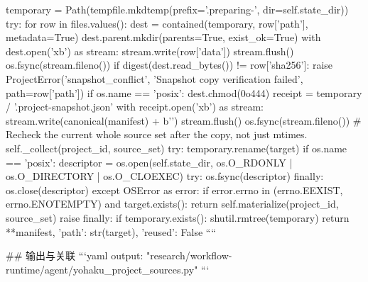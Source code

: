         temporary = Path(tempfile.mkdtemp(prefix='.preparing-', dir=self.state_dir))
        try:
            for row in files.values():
                dest = contained(temporary, row['path'], metadata=True)
                dest.parent.mkdir(parents=True, exist_ok=True)
                with dest.open('xb') as stream:
                    stream.write(row['data'])
                    stream.flush()
                    os.fsync(stream.fileno())
                if digest(dest.read_bytes()) != row['sha256']:
                    raise ProjectError('snapshot_conflict', 'Snapshot copy verification failed', path=row['path'])
                if os.name == 'posix':
                    dest.chmod(0o444)
            receipt = temporary / '.project-snapshot.json'
            with receipt.open('xb') as stream:
                stream.write(canonical(manifest) + b'\n')
                stream.flush()
                os.fsync(stream.fileno())
            # Recheck the current whole source set after the copy, not just mtimes.
            self._collect(project_id, source_set)
            try:
                temporary.rename(target)
                if os.name == 'posix':
                    descriptor = os.open(self.state_dir, os.O_RDONLY | os.O_DIRECTORY | os.O_CLOEXEC)
                    try:
                        os.fsync(descriptor)
                    finally:
                        os.close(descriptor)
            except OSError as error:
                if error.errno in (errno.EEXIST, errno.ENOTEMPTY) and target.exists():
                    return self.materialize(project_id, source_set)
                raise
        finally:
            if temporary.exists():
                shutil.rmtree(temporary)
        return {**manifest, 'path': str(target), 'reused': False}
````

## 输出与关联
```yaml
output: "research/workflow-runtime/agent/yohaku_project_sources.py"
```
